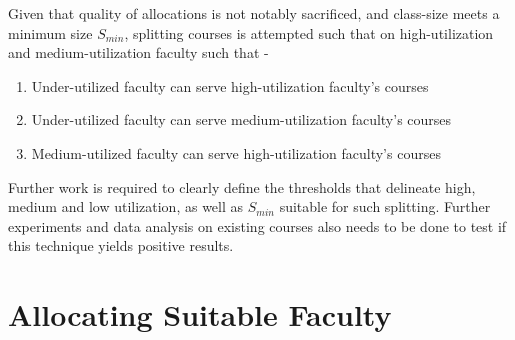 Given that quality of allocations is not notably sacrificed, and class-size meets a minimum size \(S_{min}\), splitting courses is attempted such that on high-utilization and medium-utilization faculty such that -

\begin{enumerate}
\item Under-utilized faculty can serve high-utilization faculty’s courses
\item Under-utilized faculty can serve medium-utilization faculty’s courses
\item Medium-utilized faculty can serve high-utilization faculty’s courses
\end{enumerate}

Further work is required to clearly define the thresholds that delineate high, medium and low utilization, as well as \(S_{min}\) suitable for such splitting. Further experiments and data analysis on existing courses also needs to be done to test if this technique yields positive results.






\section{Allocating Suitable Faculty}
\label{section:allocation_criteria}

